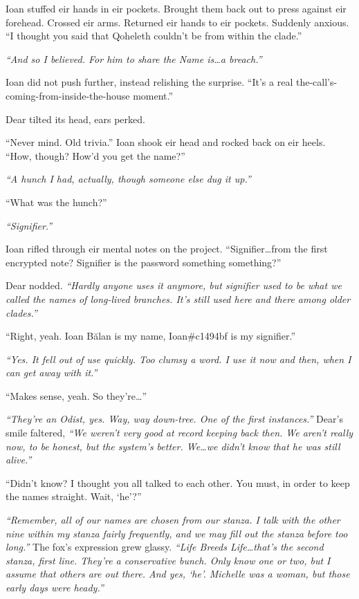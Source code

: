 Ioan stuffed eir hands in eir pockets. Brought them back out to press against eir forehead. Crossed eir arms. Returned eir hands to eir pockets. Suddenly anxious. ``I thought you said that Qoheleth couldn't be from within the clade.''

\emph{``And so I believed. For him to share the Name is\ldots{}a breach.''}

Ioan did not push further, instead relishing the surprise. ``It's a real the-call's-coming-from-inside-the-house moment.''

Dear tilted its head, ears perked.

``Never mind. Old trivia.'' Ioan shook eir head and rocked back on eir heels. ``How, though? How'd you get the name?''

\emph{``A hunch I had, actually, though someone else dug it up.''}

``What was the hunch?''

\emph{``Signifier.''}

Ioan rifled through eir mental notes on the project. ``Signifier\ldots{}from the first encrypted note? Signifier is the password something something?''

Dear nodded. \emph{``Hardly anyone uses it anymore, but signifier used to be what we called the names of long-lived branches. It's still used here and there among older clades.''}

``Right, yeah. Ioan Bălan is my name, Ioan\#c1494bf is my signifier.''

\emph{``Yes. It fell out of use quickly. Too clumsy a word. I use it now and then, when I can get away with it.''}

``Makes sense, yeah. So they're\ldots{}''

\emph{``They're an Odist, yes. Way, way down-tree. One of the first instances.''} Dear's smile faltered, \emph{``We weren't very good at record keeping back then. We aren't really now, to be honest, but the system's better. We\ldots{}we didn't know that he was still alive.''}

``Didn't know? I thought you all talked to each other. You must, in order to keep the names straight. Wait, `he'?''

\emph{``Remember, all of our names are chosen from our stanza. I talk with the other nine within my stanza fairly frequently, and we may fill out the stanza before too long.''} The fox's expression grew glassy. \emph{``Life Breeds Life\ldots{}that's the second stanza, first line. They're a conservative bunch. Only know one or two, but I assume that others are out there. And yes, `he'. Michelle was a woman, but those early days were heady.''}

